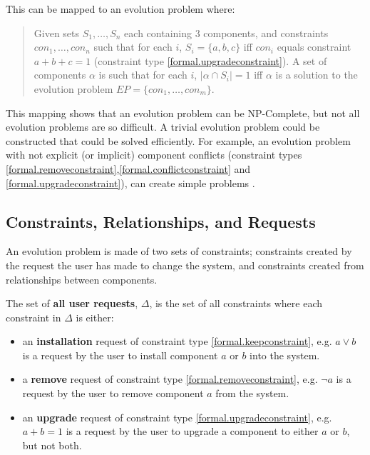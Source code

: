 This can be mapped to an evolution problem where:
\begin{quote}
Given sets $S_1, \ldots, S_n$ each containing 3 components, and constraints $con_1,\ldots,con_n$
such that for each $i$, $S_i = \{a,b,c\}$ iff $con_i$ equals constraint $a + b + c = 1$ (constraint type \ref{formal.upgradeconstraint}).
A set of components $\alpha$ is such that for each $i$, $|\alpha \cap S_i|  =  1$ iff $\alpha$ is a solution to the evolution problem $EP = \{con_1,\ldots,con_m\}$.
\end{quote}
This mapping shows that an evolution problem can be NP-Complete, but not all evolution problems are so difficult.
A trivial evolution problem could be constructed that could be solved efficiently.
For example, an evolution problem with not explicit (or implicit) component conflicts 
(constraint types \ref{formal.removeconstraint},\ref{formal.conflictconstraint} and \ref{formal.upgradeconstraint}), can create simple problems \citep{abate2011}.

\subsection{Constraints, Relationships, and Requests}
\label{formal.constraints}
An evolution problem is made of two sets of constraints; constraints created by the request the user has made to change the system, 
and constraints created from relationships between components.

\begin{defs}
The set of \textbf{all user requests}, $\Delta$, is the set of all constraints where each constraint in $\Delta$ is either:
\begin{itemize}
  \item an \textbf{installation} request of constraint type \ref{formal.keepconstraint}, e.g. $a \vee b$ is a request by the user to install component $a$ or $b$ into the system.
  \item a \textbf{remove} request of constraint type \ref{formal.removeconstraint}, e.g. $\neg a$ is a request by the user to remove component $a$ from the system.
  \item an \textbf{upgrade} request of constraint type \ref{formal.upgradeconstraint}, e.g. $a + b = 1$ is a request by the user to upgrade a component to either $a$ or $b$, but not both.
\end{itemize}
\end{defs}


